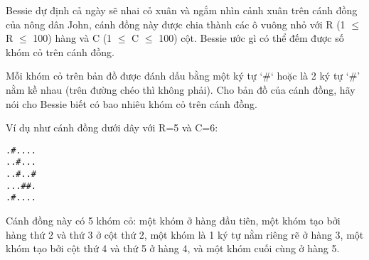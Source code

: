 Bessie dự định cả ngày sẽ nhai cỏ xuân và ngắm nhìn cảnh xuân trên  cánh đồng của nông dân John, cánh đồng này được chia thành các ô vuông nhỏ với R (1  $\le$  R  $\le$  100) hàng và C (1  $\le$  C  $\le$  100) cột. Bessie ước gì  có thể đếm được số khóm cỏ trên cánh đồng.  

   Mỗi khóm cỏ trên bản đồ được đánh dấu bằng một ký tự ‘\#‘ hoặc là 2 ký  tự ‘\#’ nằm kề nhau (trên đường chéo thì không phải). Cho bản đồ của  cánh đồng, hãy nói cho Bessie biết có bao nhiêu khóm cỏ trên  cánh đồng.  

   Ví dụ như cánh đồng dưới dây với R=5 và C=6:  
\begin{verbatim}
.#....
..#...
..#..#
...##.
.#....
\end{verbatim}

   Cánh đồng này có 5 khóm cỏ: một khóm ở hàng đầu tiên, một khóm tạo  bởi hàng thứ 2 và thứ 3 ở cột thứ 2, một khóm là 1 ký tự nằm riêng  rẽ ở hàng 3, một khóm tạo bởi cột thứ 4 và thứ 5 ở hàng 4, và một  khóm cuối cùng ở hàng 5.